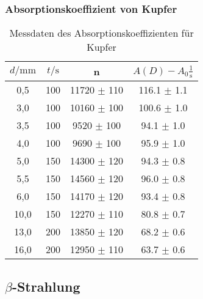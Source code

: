 \subsubsection*{Absorptionskoeffizient von Kupfer}

\begin{table}
    \center
    \begin{tabular}{c c c c}
        \toprule
        $d / \unit{\milli\meter}$ &  $t / \unit\second$ &     n & $A(D) - A_0 \frac{1}{\unit\second}$\\
        \midrule
            0,5 &    100 & 11720 $\pm$ 110 & 116.1 $\pm$ 1.1 \\
            3,0 &    100 & 10160 $\pm$ 100 & 100.6 $\pm$ 1.0 \\
            3,5 &    100 &  9520 $\pm$ 100 &  94.1 $\pm$ 1.0 \\
            4,0 &    100 &  9690 $\pm$ 100 &  95.9 $\pm$ 1.0 \\
            5,0 &    150 & 14300 $\pm$ 120 &  94.3 $\pm$ 0.8 \\
            5,5 &    150 & 14560 $\pm$ 120 &  96.0 $\pm$ 0.8 \\
            6,0 &    150 & 14170 $\pm$ 120 &  93.4 $\pm$ 0.8 \\
           10,0 &    150 & 12270 $\pm$ 110 &  80.8 $\pm$ 0.7 \\
           13,0 &    200 & 13850 $\pm$ 120 &  68.2 $\pm$ 0.6 \\
           16,0 &    200 & 12950 $\pm$ 110 &  63.7 $\pm$ 0.6 \\
        \bottomrule
    \end{tabular}
    \caption{Messdaten des Absorptionskoeffizienten für Kupfer}
    \label{tab:md2kupfer}
\end{table}

\subsection[Beta-Strahlung]{$\beta$-Strahlung}

